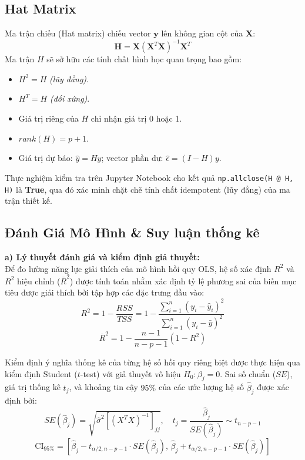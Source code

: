 \documentclass[12pt,a4paper]{article}
\begin{document}
\subsection{Hat Matrix}
Ma trận chiếu (Hat matrix) chiếu vector $\mathbf{y}$ lên không gian cột của $\mathbf{X}$:
\begin{equation}
    \mathbf{H} = \mathbf{X}(\mathbf{X}^T\mathbf{X})^{-1}\mathbf{X}^T
\end{equation}
Ma trận $H$ sẽ sở hữu các tính chất hình học quan trọng bao gồm:
\begin{itemize}
    \item $H^2 = H$ \textit{(lũy đẳng)}.
    \item $H^T = H$ \textit{(đối xứng)}.
    \item Giá trị riêng của $H$ chỉ nhận giá trị 0 hoặc 1.
    \item $rank(H) = p +1$.
    \item Giá trị dự báo: $\hat{y} = Hy$; vector phần dư: $\hat{\epsilon} = (I - H)y$.
\end{itemize}
Thực nghiệm kiểm tra trên Jupyter Notebook cho kết quả \texttt{np.allclose(H @ H, H)} là \textbf{True}, qua đó xác minh chặt chẽ tính chất idempotent (lũy đẳng) của ma trận thiết kế.

\subsection{Đánh Giá Mô Hình \& Suy luận thống kê}
\textbf{a) Lý thuyết đánh giá và kiểm định giả thuyết:} \\
Để đo lường năng lực giải thích của mô hình hồi quy OLS, hệ số xác định $R^2$ và $R^2$ hiệu chỉnh ($\overline{R}^2$) được tính toán nhằm xác định tỷ lệ phương sai của biến mục tiêu được giải thích bởi tập hợp các đặc trưng đầu vào:
\begin{equation}
    R^2 = 1 - \frac{RSS}{TSS} = 1 - \frac{\sum_{i=1}^{n}(y_i - \hat{y}_i)^2}{\sum_{i=1}^{n}(y_i - \bar{y})^2}
\end{equation}
\begin{equation}
    \overline{R}^2 = 1 - \frac{n - 1}{n - p - 1}(1 - R^2)
\end{equation}

Kiểm định ý nghĩa thống kê của từng hệ số hồi quy riêng biệt được thực hiện qua kiểm định Student ($t$-test) với giả thuyết vô hiệu $H_0: \beta_j = 0$. Sai số chuẩn ($SE$), giá trị thống kê $t_j$, và khoảng tin cậy $95\%$ của các ước lượng hệ số $\hat{\beta}_j$ được xác định bởi:
\begin{equation}
    SE(\hat{\beta}_j) = \sqrt{\hat{\sigma}^2 [(X^T X)^{-1}]_{jj}}, \quad t_j = \frac{\hat{\beta}_j}{SE(\hat{\beta}_j)} \sim t_{n-p-1}
\end{equation}
\begin{equation}
    \text{CI}_{95\%} = \left[ \hat{\beta}_j - t_{\alpha/2, n-p-1} \cdot SE(\hat{\beta}_j), \, \hat{\beta}_j + t_{\alpha/2, n-p-1} \cdot SE(\hat{\beta}_j) \right]
\end{equation}
\end{document}
